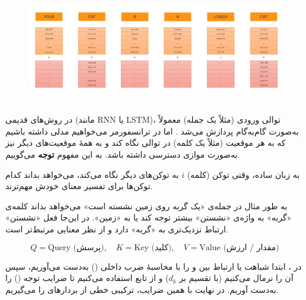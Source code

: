 \begin{figure}[h]
	\centering
	\begin{minipage}[b]{0.7\textwidth}
		\centering
		\includegraphics[width=\textwidth]{transformer_images/positional_embedding.png}
		\caption{}
		\label{fig:word_embedding_positional_embedding}
	\end{minipage}
	\hfill
\end{figure}






\subsection{}



در روش‌های قدیمی (مانند RNN یا LSTM)، توالی ورودی (مثلاً یک جمله) معمولاً به‌صورت گام‌به‌گام پردازش می‌شد \cite{elman1990finding,hochreiter1997long}. اما در ترانسفورمر می‌خواهیم مدلی داشته باشیم که به هر موقعیت (مثلاً یک کلمه) در توالی نگاه کند و به همهٔ موقعیت‌های دیگر نیز به‌صورت موازی دسترسی داشته باشد. به این مفهوم \textbf{توجه} می‌گوییم.

به زبان ساده، وقتی توکن (کلمه) \( i \) به توکن‌های دیگر نگاه می‌کند، می‌خواهد بداند کدام توکن‌ها برای تفسیر معنای خودش مهم‌ترند.

به طور مثال در جمله‌ی «یک گربه روی زمین نشسته است» می‌خواهد بداند کلمه‌ی «گربه» به واژه‌ی «نشستن» بیشتر توجه کند یا به «زمین». در این‌جا فعل «نشستن» ارتباط نزدیک‌تری به «گربه» دارد و از نظر معنایی مرتبط‌تر است.



\[
Q = \text{Query (پرسش)}, \quad K = \text{Key (کلید)}, \quad V = \text{Value (مقدار / ارزش)}
\]





در  \cite{vaswani2017attention}، ابتدا شباهت یا ارتباط بین  و  را با محاسبهٔ ضرب داخلی () به‌دست می‌آوریم، سپس آن را نرمال می‌کنیم (با تقسیم بر \( d_k \)) و از تابع  استفاده می‌کنیم تا ضرایب توجه () را به‌دست آوریم. در نهایت با همین ضرایب، ترکیبی خطی از بردارهای  را می‌گیریم.

